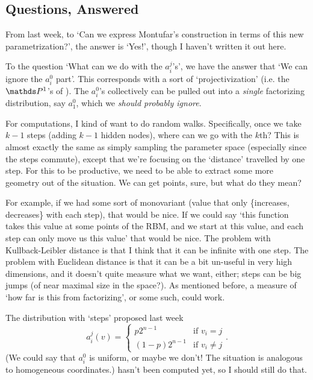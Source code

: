 \documentclass[11pt]{article}
\begin{document}
\subsection{Questions, Answered}

From last week, to `Can we express Montufar's construction in terms of this new
parametrization?', the answer is `Yes!', though I haven't written it out here.

To the question `What can we do with the $a_i^j$'s', we have the answer that `We
can ignore the $a_i^0$ part'.  This corresponds with a sort of
`projectivization' (i.e. the $\Proj^1$'s of \cite{CMS09}).  The $a_i^0$'s
collectively can be pulled out into a \textit{single} factorizing distribution,
say $a_1^0$, which we \textit{should probably ignore}.

For computations, I kind of want to do random walks.  Specifically, once we take
$k-1$ steps (adding $k-1$ hidden nodes), where can we go with the $k$th?  This
is almost exactly the same as simply sampling the parameter space (especially
since the steps commute), except that we're focusing on the `distance' travelled
by one step.  For this to be productive, we need to be able to extract some more
geometry out of the situation.  We can get points, sure, but what do they mean?

For example, if we had some sort of monovariant (value that only
\{increases, decreases\} with each step), that would be nice.  If we could say
`this function takes this value at some points of the RBM, and we start at this
value, and each step can only move us this value' that would be nice.  The
problem with Kullback-Leibler distance is that I think that it can be infinite
with one step.  The problem with Euclidean distance is that it can be a bit
un-useful in very high dimensions, and it doesn't quite measure what we want,
either; steps can be big jumps (of near maximal size in the space?).  As
mentioned before, a measure of `how far is this from factorizing', or some such,
could work.

The distribution with `steps' proposed last week
\[
    a_i^j(v) = \begin{cases}
        p 2^{n-1} & \text{if $v_i = j$}\\
        (1 - p) 2^{n-1}  & \text{if $v_i \ne j$}
    \end{cases}.
\]
(We could say that $a_i^0$ is uniform, or maybe we don't!  The situation is
analogous to homogeneous coordinates.)  hasn't been computed yet, so I should
still do that.
\end{document}

